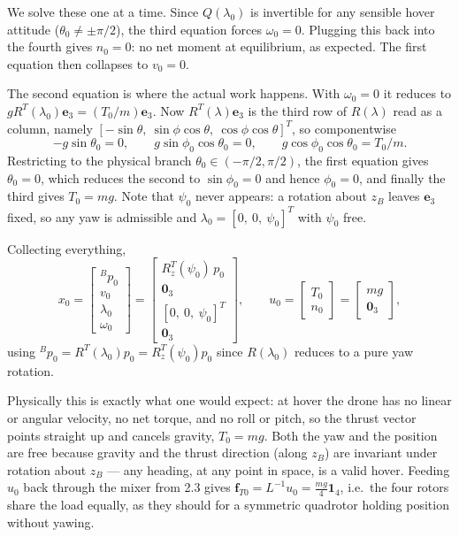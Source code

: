 \documentclass[11pt]{article}
\begin{document}
We solve these one at a time. Since $Q(\lambda_0)$ is invertible for any sensible hover attitude ($\theta_0\neq\pm\pi/2$), the third equation forces $\omega_0=0$. Plugging this back into the fourth gives $n_0=0$: no net moment at equilibrium, as expected. The first equation then collapses to $v_0=0$.

The second equation is where the actual work happens. With $\omega_0=0$ it reduces to $gR^T(\lambda_0)\mathbf{e}_3 = (T_0/m)\mathbf{e}_3$. Now $R^T(\lambda)\mathbf{e}_3$ is the third row of $R(\lambda)$ read as a column, namely $[-\sin\theta,\ \sin\phi\cos\theta,\ \cos\phi\cos\theta]^T$, so componentwise
\[
-g\sin\theta_0 = 0, \qquad g\sin\phi_0\cos\theta_0 = 0, \qquad g\cos\phi_0\cos\theta_0 = T_0/m.
\]
Restricting to the physical branch $\theta_0\in(-\pi/2,\pi/2)$, the first equation gives $\theta_0=0$, which reduces the second to $\sin\phi_0=0$ and hence $\phi_0=0$, and finally the third gives $T_0=mg$. Note that $\psi_0$ never appears: a rotation about $z_B$ leaves $\mathbf{e}_3$ fixed, so any yaw is admissible and $\lambda_0=[0,\ 0,\ \psi_0]^T$ with $\psi_0$ free.

Collecting everything,
\[
x_0 = \begin{bmatrix} {}^B\!p_0 \\ v_0 \\ \lambda_0 \\ \omega_0\end{bmatrix} = \begin{bmatrix} R_z^T(\psi_0)\,p_0 \\ \mathbf{0}_3 \\ [0,\ 0,\ \psi_0]^T \\ \mathbf{0}_3 \end{bmatrix}, \qquad u_0 = \begin{bmatrix} T_0 \\ n_0\end{bmatrix} = \begin{bmatrix} mg \\ \mathbf{0}_3\end{bmatrix},
\]
using ${}^B\!p_0=R^T(\lambda_0)p_0=R_z^T(\psi_0)p_0$ since $R(\lambda_0)$ reduces to a pure yaw rotation.

Physically this is exactly what one would expect: at hover the drone has no linear or angular velocity, no net torque, and no roll or pitch, so the thrust vector points straight up and cancels gravity, $T_0=mg$. Both the yaw and the position are free because gravity and the thrust direction (along $z_B$) are invariant under rotation about $z_B$ --- any heading, at any point in space, is a valid hover. Feeding $u_0$ back through the mixer from 2.3 gives $\mathbf{f}_{T0}=L^{-1}u_0=\tfrac{mg}{4}\mathbf{1}_4$, i.e.\ the four rotors share the load equally, as they should for a symmetric quadrotor holding position without yawing.
\end{document}
